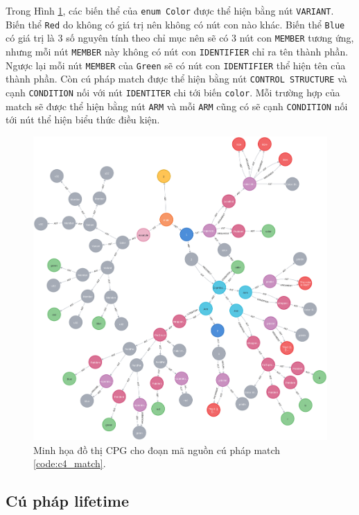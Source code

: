 Trong Hình \ref{img:c4_match}, các biến thể của \texttt{enum Color} được thể hiện bằng nút \texttt{VARIANT}.
Biến thể \texttt{Red} do không có giá trị nên không có nút con nào khác.
Biến thể \texttt{Blue} có giá trị là 3 số nguyên tính theo chỉ mục nên sẽ có 3 nút con \texttt{MEMBER} tương ứng, nhưng mỗi nút \texttt{MEMBER} này không có nút con \texttt{IDENTIFIER} chỉ ra tên thành phần.
Ngược lại mỗi nút \texttt{MEMBER} của \texttt{Green} sẽ có nút con \texttt{IDENTIFIER} thể hiện tên của thành phần.
Còn cú pháp match được thể hiện bằng nút \texttt{CONTROL STRUCTURE} và cạnh \texttt{CONDITION} nối với nút \texttt{IDENTITER} chi tới biến \texttt{color}.
Mỗi trường hợp của match sẽ được thể hiện bằng nút \texttt{ARM} và mỗi \texttt{ARM} cũng có sẽ cạnh \texttt{CONDITION} nối tới nút thể hiện biểu thức điều kiện.

\begin{figure}[H]
    \includegraphics[width=1\columnwidth]{figures/c4/c4_match.png}
    \centering
    \caption{Minh họa đồ thị CPG cho đoạn mã nguồn cú pháp match \ref{code:c4_match}.}
    \label{img:c4_match}
\end{figure}

\subsection{Cú pháp lifetime}

